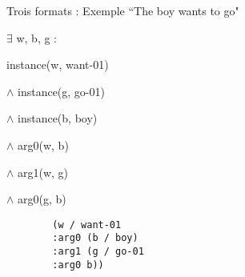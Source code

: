 \documentclass{KodeBook}
\begin{document}
\begin{exampleblock}{Trois formats : Exemple ``The boy wants to go"}
	\begin{minipage}{.3\textwidth}
		
		\footnotesize
		$ \exists $ w, b, g : 
		
		instance(w, want-01) 
		
		$ \wedge $ instance(g, go-01) 
		
		$ \wedge $ instance(b, boy) 
		
		$ \wedge $ arg0(w, b) 
		
		$ \wedge $ arg1(w, g) 
		
		$ \wedge $ arg0(g, b)
	\end{minipage}
	\begin{minipage}{.35\textwidth}
		
		\begin{verbatim}
		(w / want-01
		:arg0 (b / boy)
		:arg1 (g / go-01
		:arg0 b))
		\end{verbatim}
		
	\end{minipage}
	\begin{minipage}{.3\textwidth}
		
	\end{minipage}
\end{exampleblock}
\end{document}
